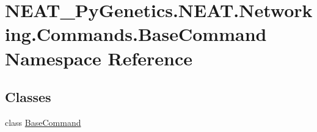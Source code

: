 \hypertarget{namespaceNEAT__PyGenetics_1_1NEAT_1_1Networking_1_1Commands_1_1BaseCommand}{}\section{N\+E\+A\+T\+\_\+\+Py\+Genetics.\+N\+E\+A\+T.\+Networking.\+Commands.\+Base\+Command Namespace Reference}
\label{namespaceNEAT__PyGenetics_1_1NEAT_1_1Networking_1_1Commands_1_1BaseCommand}
\subsection*{Classes}
\begin{DoxyCompactItemize}
\item 
class \hyperlink{classNEAT__PyGenetics_1_1NEAT_1_1Networking_1_1Commands_1_1BaseCommand_1_1BaseCommand}{Base\+Command}
\end{DoxyCompactItemize}
